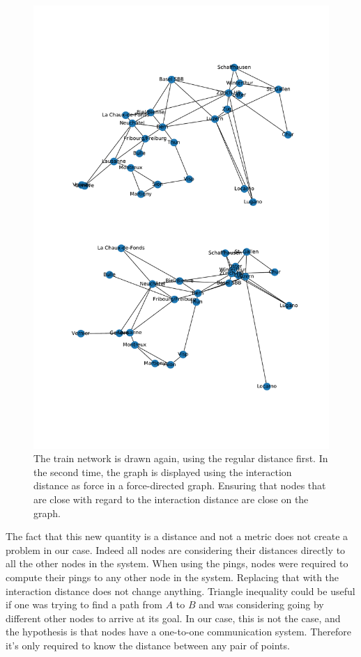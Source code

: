 \documentclass[a4paper,11pt,twoside,openright]{report}
\begin{document}
\begin{figure}[!h] 
\centering
\includegraphics[width=350pt]{figures/CFF-NewDistances}
\caption{The train network is drawn again, using the regular distance first. In
 the second time, the graph is displayed using the interaction distance as
 force in a force-directed graph. Ensuring that nodes that are close with
 regard to the interaction distance are close on the graph.}
 \label{fig:CFF-NewDistances}
\end{figure}

The fact that this new quantity is a distance and not a metric does not create
a problem in our case. Indeed all nodes are considering their distances directly
to all the other nodes in the system. When using the pings, nodes were required
to compute their pings to any other node in the system. Replacing that with the
interaction distance does not change anything. Triangle inequality could be
useful if one was trying to find a path from $A$ to $B$ and was considering
going by different other nodes to arrive at its goal. In our case, this is not
the case, and the hypothesis is that nodes have a one-to-one communication system.
Therefore it's only required to know the distance between any pair of points.
\end{document}
